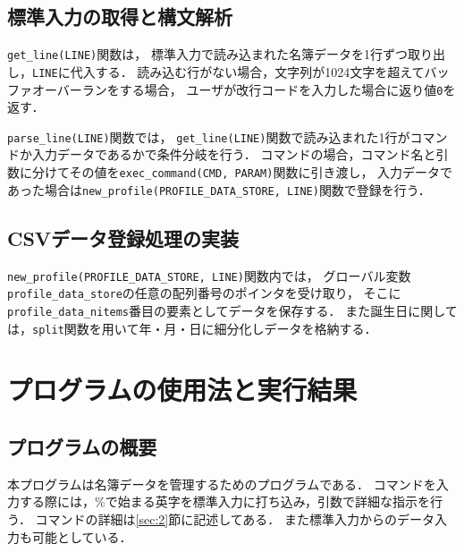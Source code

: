 \documentclass[autodetect-engine,dvi=dvipdfmx,ja=standard,
               a4j,11pt]{bxjsarticle}
\begin{document}
\subsection{標準入力の取得と構文解析}

\verb|get_line(LINE)|関数は，
標準入力で読み込まれた名簿データを1行ずつ取り出し，\verb|LINE|に代入する．
読み込む行がない場合，文字列が1024文字を超えてバッファオーバーランをする場合，
ユーザが改行コードを入力した場合に返り値\verb|0|を返す．

\verb|parse_line(LINE)|関数では，
\verb|get_line(LINE)|関数で読み込まれた1行がコマンドか入力データであるかで条件分岐を行う．
コマンドの場合，コマンド名と引数に分けてその値を\verb|exec_command(CMD, PARAM)|関数に引き渡し，
入力データであった場合は\verb|new_profile(PROFILE_DATA_STORE, LINE)|関数で登録を行う．

\subsection{CSVデータ登録処理の実装}

\verb|new_profile(PROFILE_DATA_STORE, LINE)|関数内では，
グローバル変数\verb|profile_data_store|の任意の配列番号のポインタを受け取り，
そこに\verb|profile_data_nitems|番目の要素としてデータを保存する．
また誕生日に関しては，\verb|split|関数を用いて年・月・日に細分化しデータを格納する．


\section{プログラムの使用法と実行結果} \label{sec:4}

\subsection{プログラムの概要}

本プログラムは名簿データを管理するためのプログラムである．
コマンドを入力する際には，\%で始まる英字を標準入力に打ち込み，引数で詳細な指示を行う．
コマンドの詳細は\ref{sec:2}節に記述してある．
また標準入力からのデータ入力も可能としている．
\end{document}
